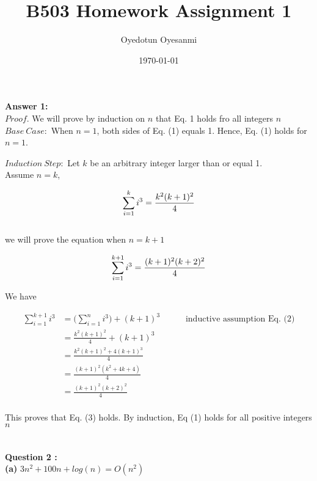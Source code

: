 \documentclass[12pt]{article}
\begin{document}
\title{B503 Homework Assignment 1}
\author{Oyedotun Oyesanmi}
\date{\today}
\maketitle

\textbf{Answer 1:}\\

$Proof. $ We will prove by induction on $n$ that Eq. 1 holds fro all integers $n$\\

$Base\ Case: $ When $n = 1$, both sides of Eq. (1) equals 1. Hence, Eq. (1) holds for $n = 1$.

$Induction\ Step: $ Let $k$ be an arbitrary integer larger than or equal 1. \\

Assume $ n = k$,

\begin{equation}
\sum_{i=1}^{k} i^{3} = \frac{k^{2}(k+1)^{2}}{4} \\
\end{equation} 
\\

we will prove the equation when $n= k+1$

\begin{equation}
\sum_{i=1}^{k+1} i^{3} = \frac{(k+1)^{2}(k +2)^{2}}{4} \\
\end{equation} 

We have

\begin{align*}
\sum_{i=1}^{k+1} i^{3}
&= \biggl(\sum_{i=1}^{n} i^{3}\biggr) +  (k+1)^3 \text{~~~~~~~~ inductive\ assumption\ Eq. (2)}\\[7pt]
&= \frac{k^{2}(k+1)^{2}}{4} + (k+1)^3 \\[7pt]
&= \frac{k^{2}(k+1)^{2} + 4(k+1)^3}{4}\\[7pt]
&= \frac{(k+1)^{2}(k^{2} + 4k + 4)}{4}\\[7pt]
&= \frac{(k+1)^{2}(k+2)^{2}}{4}\\[7pt]
\end{align*}

This proves that Eq. (3) holds.  By induction, Eq (1) holds for all positive integers $n$\\
\\
\\

\textbf{Question 2 : } \\

\textbf{(a)} $3n^2 + 100n + log(n) = O(n^2) $\\
\end{document}
